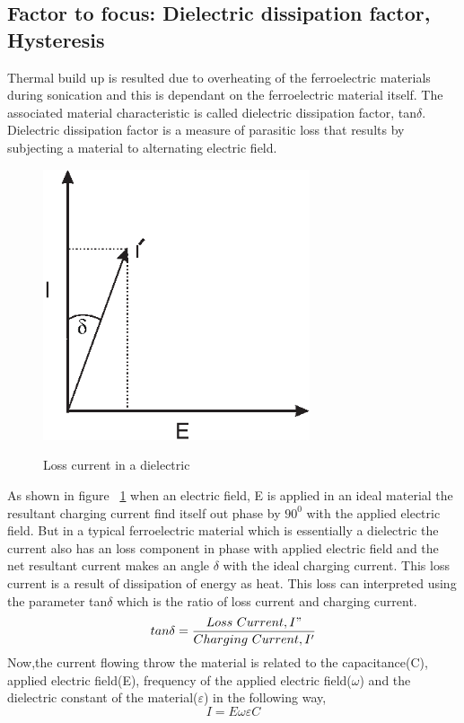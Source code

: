 \subsection{Factor to focus: Dielectric dissipation factor, Hysteresis}
Thermal build up is resulted due to overheating of the ferroelectric materials during sonication and this is  dependant on the ferroelectric material itself. The associated material characteristic is called dielectric dissipation factor, tan$\delta$.
Dielectric dissipation factor is a measure of parasitic loss that results by subjecting a material to alternating electric field. \begin{figure}[t]
\centering
	\includegraphics[width=0.7\textwidth]{E-Icharacteristics.eps}\\
	\caption[Loss current in a dielectric]{Loss current in a dielectric}\label{fig:Loss current in a dielectric}
\end{figure}As shown in figure ~\ref{fig:Loss current in a dielectric} when an electric field, E is applied in an ideal material the resultant charging current find itself out phase by $90^{0}$ with the applied electric field. But in a typical ferroelectric material which is essentially a dielectric the current also has an loss component in phase with applied electric field and the net resultant current makes an angle $\delta$ with the ideal charging current. This loss current is a result of dissipation of energy as heat. This loss can interpreted using the parameter tan$\delta$ which is the ratio of loss current and charging current.
 \begin{equation}\label{Eq:tandeltacurrentloss}
    tan\delta =\frac{Loss\ Current,I"}{Charging\ Current, I'}
\end{equation}
Now,the current flowing throw the material is related to the capacitance(C), applied electric field(E), frequency of the applied electric field($\omega$) and the dielectric constant of the material($\varepsilon$) in the following way,
 \begin{equation}\label{Eq:currentand capacitance}
    I=E\omega\varepsilon C
\end{equation}

